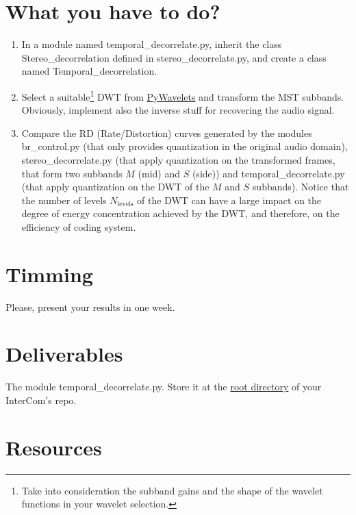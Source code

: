 \section{What you have to do?}

\begin{enumerate}
\item In a module named temporal\_decorrelate.py, inherit the class
  Stereo\_decorrelation defined in stereo\_decorrelate.py, and create
  a class named Temporal\_decorrelation.
\item Select a suitable\footnote{Take into consideration the subband
    gains and the shape of the wavelet functions in your wavelet
    selection.} DWT
    from \href{https://pywavelets.readthedocs.io/en/latest/}{PyWavelets}
    and transform the MST subbands. Obviously, implement also the
    inverse stuff for recovering the audio signal.
\item Compare the RD (Rate/Distortion) curves generated by the modules
  br\_control.py (that only provides quantization in the original
  audio domain), stereo\_decorrelate.py (that apply quantization on
  the transformed frames, that form two subbands $M$ (mid) and $S$
  (side)) and temporal\_decorrelate.py (that apply quantization on the
  DWT of the $M$ and $S$ subbands). Notice that the number of levels
  $N_{\text{levels}}$ of the DWT can have a large impact on the degree
  of energy concentration achieved by the DWT, and therefore, on the
  efficiency of coding system.
\end{enumerate}

\section{Timming}

Please, present your results in one week.

\section{Deliverables}

The module temporal\_decorrelate.py. Store it at the
\href{https://github.com/Tecnologias-multimedia/intercom}{root
  directory} of your InterCom's repo.

\section{Resources}



